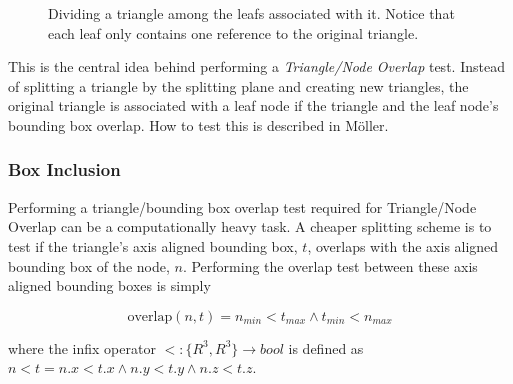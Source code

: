 \begin{figure}
  \centering
  
  \vspace{3mm}
  \parbox{5cm}{\caption[Dividing a triangle.]{Dividing a triangle among the
      leafs associated with it. Notice that each leaf only contains one
      reference to the original triangle.}\label{fig:dividing}}
\end{figure}

This is the central idea behind performing a \textit{Triangle/Node Overlap}
test. Instead of splitting a triangle by the splitting plane and creating new
triangles, the original triangle is associated with a leaf node if the triangle
and the leaf node's bounding box overlap. How to test this is described in
Möller.



\subsubsection{Box Inclusion}\label{sec:boxInclusion}


Performing a triangle/bounding box overlap test required for Triangle/Node
Overlap can be a computationally heavy task. A cheaper splitting scheme is to
test if the triangle's axis aligned bounding box, $t$, overlaps with the axis
aligned bounding box of the node, $n$. Performing the overlap test between these
axis aligned bounding boxes is simply

\begin{displaymath}
  \text{overlap}(n,t) = n_{min} < t_{max} \wedge t_{min} < n_{max}
\end{displaymath}

where the infix operator $<: \{R^3, R^3\} \rightarrow bool$ is defined as $n < t
= n.x < t.x \wedge n.y < t.y \wedge n.z < t.z$.

